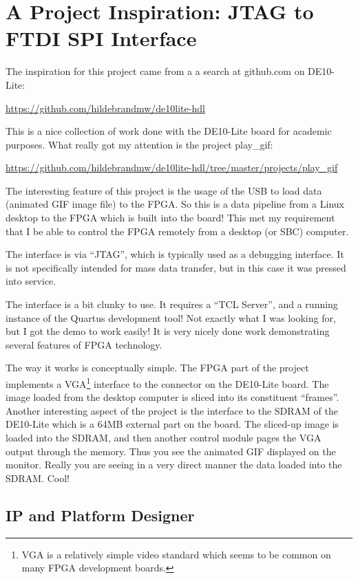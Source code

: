 \section{A Project Inspiration: JTAG to FTDI SPI Interface}

The inspiration for this project came from a a search at github.com on DE10-Lite:

\url{https://github.com/hildebrandmw/de10lite-hdl}

This is a nice collection of work done with the DE10-Lite board for academic purposes.
What really got my attention is the project play\_gif:

\url{https://github.com/hildebrandmw/de10lite-hdl/tree/master/projects/play_gif}

The interesting feature of this project is the usage of the USB to load data (animated GIF image file)
to the FPGA.  So this is a data pipeline from a Linux desktop to the FPGA which is built into the board!
This met my requirement that I be able to control the FPGA remotely from a desktop (or SBC) computer.

The interface is via ``JTAG'', which is typically used as a debugging interface.  It is not specifically intended for mass data transfer, but in this case it was pressed into service.

The interface is a bit clunky to use.  It requires a ``TCL Server'', and a running instance of the Quartus development tool!  Not exactly what I was looking for, but I got the demo to work easily!  It is very nicely done work demonstrating several features of FPGA technology.

The way it works is conceptually simple.  The FPGA part of the project implements a VGA\footnote{VGA is a relatively simple video standard which seems to be common on many FPGA development boards.} interface to the connector on the DE10-Lite board.  The image loaded from the desktop computer is sliced into its constituent ``frames''.
Another interesting aspect of the project is the interface to the SDRAM of the DE10-Lite which is a 64MB external part on the board.  The sliced-up image is loaded into the SDRAM, and then another control module pages the VGA output through the memory.  Thus you see the animated GIF displayed on the monitor.  Really you are seeing in a very direct manner the data loaded into the SDRAM.  Cool!

\subsection{IP and Platform Designer}

